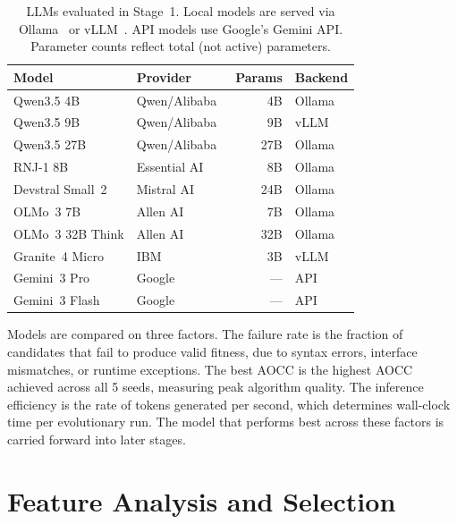 \begin{table}[t]
\centering
\caption{LLMs evaluated in Stage~1. Local models are served via Ollama~\cite{ollama} or vLLM~\cite{kwon2023vllm}. API models use Google's Gemini API. Parameter counts reflect total (not active) parameters.}
\label{tab:models}
\footnotesize
\begin{tabular}{@{}llrl@{}}
\toprule
\textbf{Model} & \textbf{Provider} & \textbf{Params} & \textbf{Backend} \\
\midrule
Qwen3.5 4B   & Qwen/Alibaba~\cite{qwen3}          & 4B  & Ollama \\
Qwen3.5 9B   & Qwen/Alibaba~\cite{qwen3}          & 9B  & vLLM \\
Qwen3.5 27B  & Qwen/Alibaba~\cite{qwen3}          & 27B & Ollama \\
RNJ-1 8B     & Essential AI~\cite{rnj1}            & 8B  & Ollama \\
Devstral Small~2 & Mistral AI~\cite{devstral2}     & 24B & Ollama \\
OLMo~3 7B    & Allen AI~\cite{olmo3}               & 7B  & Ollama \\
OLMo~3 32B Think & Allen AI~\cite{olmo3}           & 32B & Ollama \\
Granite~4 Micro  & IBM~\cite{granite4}             & 3B  & vLLM \\
\midrule
Gemini~3 Pro     & Google~\cite{gemini3pro}      & --- & API \\
Gemini~3 Flash   & Google~\cite{gemini3flash}      & --- & API \\
\bottomrule
\end{tabular}
\end{table}

Models are compared on three factors. The failure rate is the fraction of candidates that fail to produce valid fitness, due to syntax errors, interface mismatches, or runtime exceptions. The best AOCC is the highest AOCC achieved across all 5 seeds, measuring peak algorithm quality. The inference efficiency is the rate of tokens generated per second, which determines wall-clock time per evolutionary run. The model that performs best across these factors is carried forward into later stages.

\section{Feature Analysis and Selection}
\label{sec:meth-feature-selection}

